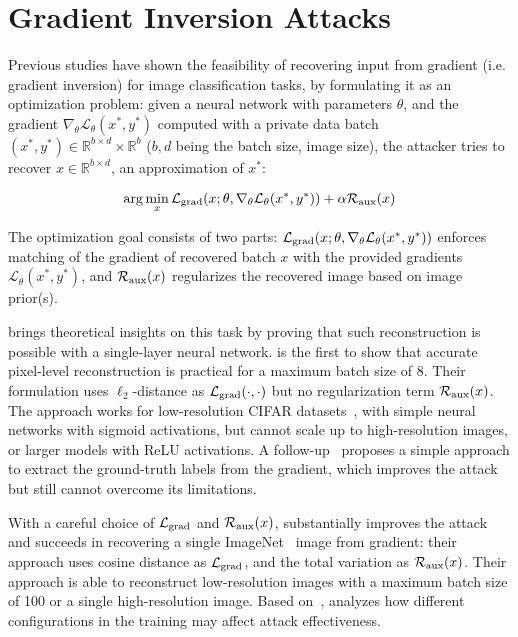 \section{Gradient Inversion Attacks}

Previous studies have shown the feasibility of recovering input from gradient (i.e. gradient inversion) for image classification tasks, by formulating it as an optimization problem: given a neural network with parameters $\theta$, and the gradient $ \nabla_\theta \mathcal{L}_{\theta}(x^*, y^*)$ computed with a private data batch $(x^*, y^*) \in \mathbb{R}^{b \times d} \times \mathbb{R}^{b}$ ($b, d$ being the batch size, image size), the attacker tries to recover $x \in \mathbb{R}^{b \times d}$, an approximation of $x^*$:

\begin{equation}
    \arg \min _{x}  \mathcal{L}_{\rm grad}(x; \theta, \nabla_{\theta} \mathcal{L}_{\theta}(x^{*}, y^{*})) + \alpha \mathcal{R}_{\rm aux}(x)
\end{equation}


The optimization goal consists of two parts: $\mathcal{L}_{\rm grad}(x; \theta, \nabla_{\theta} \mathcal{L}_{\theta}(x^{*}, y^{*}))$ enforces matching of the gradient of recovered batch $x$ with the provided gradients $\mathcal{L}_{\theta}(x^*, y^*)$, and $\mathcal{R}_{\rm aux}(x)$ regularizes the recovered image based on image prior(s). 

\citep{phong_17} brings theoretical insights on this task by proving that such reconstruction is possible with a single-layer neural network. 
\citep{zhu2020deep} is the first to show that accurate pixel-level reconstruction is practical for a maximum batch size of 8. Their formulation uses $\ell_2$-distance as $\mathcal{L}_{\rm grad}(\cdot, \cdot)$ but no regularization term $\mathcal{R}_{\rm aux}(x)$. The approach works for low-resolution CIFAR datasets~\citep{cifar10}, with simple neural networks with sigmoid activations, but cannot scale up to high-resolution images, or larger models with ReLU activations. A follow-up~\citep{zhao2020idlg} proposes a simple approach to extract the ground-truth labels from the gradient, which improves the attack but still cannot overcome its limitations.  

With a careful choice of $\mathcal{L}_{\rm grad}$ and $\mathcal{R}_{\rm aux}(x)$, \citep{geiping2020inverting} substantially improves the attack and succeeds in recovering a single ImageNet~\citep{deng2009imagenet} image from gradient: their approach uses cosine distance as $\mathcal{L}_{\rm grad}$, and the total variation as $\mathcal{R}_{\rm aux}(x)$. Their approach is able to reconstruct low-resolution images with a maximum batch size of 100 or a single high-resolution image. Based on~\citep{geiping2020inverting}, \citep{wei2020framework} analyzes how different configurations in the training may affect attack effectiveness. 

